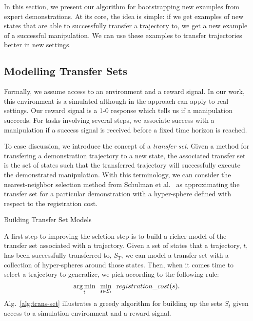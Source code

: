 In this section, we present our algorithm for bootstrapping new examples 
from expert demonstrations. At its core, the idea is simple: if we get
examples of new states that are able to successfully transfer a trajectory to,
we get a new example of a successful manipulation. We can use these examples
to transfer trajectories better in new settings.

\subsection{Modelling Transfer Sets}
Formally, we assume access to an environment and a reward signal. In our work, this
environment is a simulated although in the approach can apply to real settings. 
Our reward signal is a 1-0 response which tells us if a manipulation succeeds. For 
tasks involving several steps, we associate success with a manipulation if a success
signal is received before a fixed time horizon is reached.

To ease discussion, we introduce the concept of a \emph{transfer set}. Given a method for
transfering a demonstration trajectory to a new state, the associated transfer set is
the set of states such that the transferred trajectory will successfully execute the
demonstrated manipulation. With this terminology, we can consider the nearest-neighbor
selection method from Schulman et al.~\cite{Schulmanetal_ISRR2013} as approximating the
transfer set for a particular demonstration with a hyper-sphere defined with respect
to the registration cost.

\begin{algorithm}
        
 \caption{Building Transfer Set Models}
 \label{alg:trans-set}
\end{algorithm}

A first step to improving the selction step is to build a richer
model of the transfer set associated with a trajectory. Given a set of
states that a trajectory, $t$,  has been successfully transferred to, $S_T$, we can
model a transfer set with a collection of hyper-spheres around those states.
Then, when it comes time to select a trajectory to generalize, we pick according to
the following rule:
\begin{equation}
\underset{t}{\operatorname*{arg\,min}} \ \ \underset{s\in S_t}{\min} \ \ {\text registration\_cost}(s).
\end{equation}
Alg.~\ref{alg:trans-set} illustrates a greedy algorithm for building up the sets $S_t$ given
access to a simulation environment and a reward signal. 

